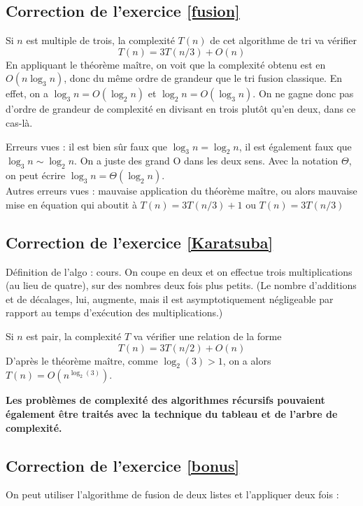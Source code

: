 \documentclass[11pt,a4paper]{article}
\begin{document}
\subsection*{Correction de l'exercice \ref{fusion}}

Si $n$ est multiple de trois, la complexité $T(n)$ de cet algorithme de tri va vérifier
\[ T(n) = 3T(n/3)+O(n)\]
En appliquant le théorème maître, on voit que la complexité obtenu est  en $O(n\log_3 n)$, donc du même ordre de grandeur que le tri fusion classique. En effet, on a $\log_3 n = O(\log_2 n)$ et $\log_2 n = O(\log_3 n)$.
On ne gagne donc pas d'ordre de grandeur de complexité en divisant en trois plutôt qu'en deux, dans ce cas-là.

Erreurs vues : il est bien sûr faux que $\log_3 n = \log_2 n$, il est également faux que $\log_3 n \sim \log_2 n$. On a juste des grand O dans les deux sens. Avec la notation $\Theta$, on peut écrire $\log_3 n = \Theta(\log_2 n)$.\\
Autres erreurs vues : mauvaise application du théorème maître, ou alors  mauvaise mise en équation qui aboutit à $T(n) = 3T(n/3)+1$ ou $T(n) = 3T(n/3)$

\subsection*{Correction de l'exercice \ref{Karatsuba}}

Définition de l'algo : cours. On coupe en deux et on effectue trois multiplications (au lieu de quatre), sur des nombres deux fois plus petits. (Le nombre d'additions et de décalages, lui, augmente, mais il est asymptotiquement négligeable par rapport au temps d'exécution des multiplications.)

Si $n$ est pair, la complexité $T$ va vérifier une relation de la forme
\[ T(n) = 3T(n/2)+O(n)\]
D'après le théorème maître, comme $\log_2(3)>1$, on a alors $T(n) = O\left(n^{\log_2(3)}\right)$.

\begin{center}
\textbf{Les problèmes de complexité des algorithmes récursifs pouvaient également être traités avec la technique du tableau et de l'arbre de complexité.}
\end{center}

\subsection*{Correction de l'exercice \ref{bonus}}

On peut utiliser l'algorithme de fusion de deux listes et l'appliquer deux fois :
\end{document}
